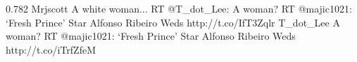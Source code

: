 {0.782}
{\joinNameTweet
{Mrjscott}
{A white woman... RT @T\_dot\_Lee: A woman? RT @majic1021: ‘Fresh Prince' Star Alfonso Ribeiro Weds http://t.co/IfT3Zqlr}}
{\joinNameTweet
{T\_dot\_Lee}
{A woman? RT @majic1021: ‘Fresh Prince' Star Alfonso Ribeiro Weds http://t.co/iTrfZfeM}}
%
%
%
%
%
%
%
